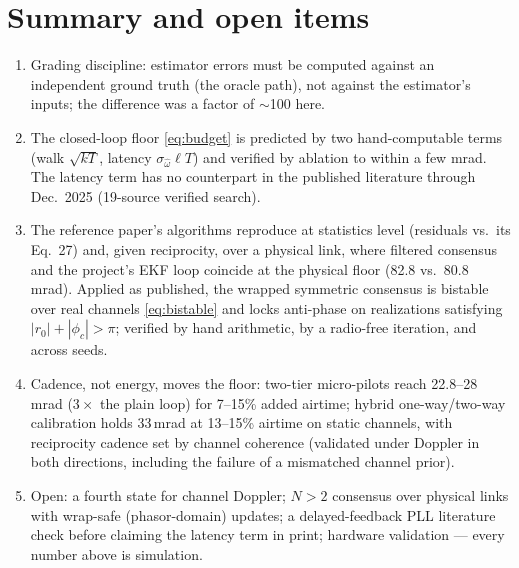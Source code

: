 \documentclass[10pt]{article}
\begin{document}
\section{Summary and open items}
\begin{enumerate}
\item Grading discipline: estimator errors must be computed against an
independent ground truth (the oracle path), not against the estimator's
inputs; the difference was a factor of $\sim$100 here.
\item The closed-loop floor \eqref{eq:budget} is predicted by two
hand-computable terms (walk $\sqrt{kT}$, latency
$\sigma_{\hat\omega}\ell T$) and verified by ablation to within a few
mrad. The latency term has no counterpart in the published literature
through Dec.\ 2025 (19-source verified search).
\item The reference paper's algorithms reproduce at statistics level
(residuals vs.\ its Eq.\ 27) and, given reciprocity, over a physical
link, where filtered consensus and the project's EKF loop coincide at
the physical floor (82.8 vs.\ 80.8\,mrad). Applied as published, the
wrapped symmetric consensus is bistable over real channels
\eqref{eq:bistable} and locks anti-phase on realizations satisfying
$|r_0|+|\phi_c|>\pi$; verified by hand arithmetic, by a radio-free
iteration, and across seeds.
\item Cadence, not energy, moves the floor: two-tier micro-pilots reach
22.8--28\,mrad ($3\times$ the plain loop) for 7--15\% added airtime;
hybrid one-way/two-way calibration holds 33\,mrad at 13--15\% airtime on
static channels, with reciprocity cadence set by channel coherence
(validated under Doppler in both directions, including the failure of a
mismatched channel prior).
\item Open: a fourth state for channel Doppler; $N>2$ consensus over
physical links with wrap-safe (phasor-domain) updates; a
delayed-feedback PLL literature check before claiming the latency term
in print; hardware validation --- every number above is simulation.
\end{enumerate}
\end{document}
